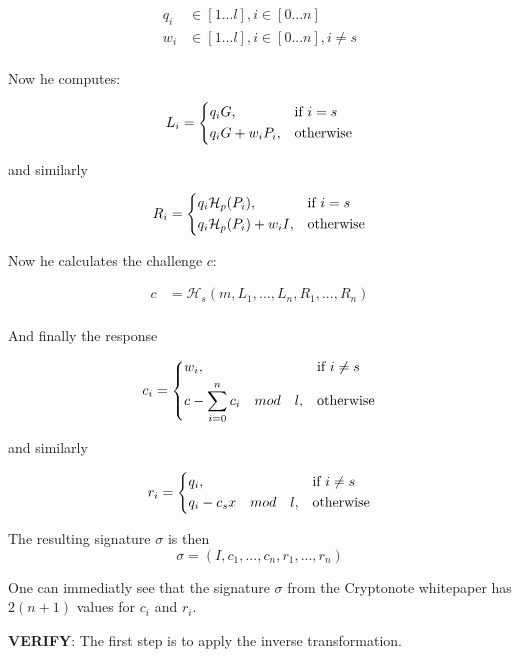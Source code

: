 \begin{equation}
\begin{split}
q_i &\in [1...l],  i \in [0...n] \\
w_i &\in [1...l],  i \in [0...n], i \not= s \\
\end{split}
\end{equation}

Now he computes:

\[
L_i= 
\begin{dcases}
q_iG,& \text{if } i = s\\
q_iG+w_iP_i,              & \text{otherwise}
\end{dcases}
\]

and similarly

\[
R_i= 
\begin{dcases}
q_i\mathcal{H}_p(P_i),& \text{if } i = s\\
q_i\mathcal{H}_p(P_i)+w_iI,              & \text{otherwise}
\end{dcases}
\]

Now he calculates the challenge $c$:

\begin{equation}
\begin{split}
c &= \mathcal{H}_s(m, L_1, ..., L_n, R_1, ..., R_n)\\
\end{split}
\end{equation}

And finally the response 

\[
c_i= 
\begin{dcases}
w_i,& \text{if } i \not= s\\
c-\sum_{i=0}^n c_i \quad mod\quad l,              & \text{otherwise}
\end{dcases}
\]

and similarly

\[
r_i= 
\begin{dcases}
q_i,& \text{if } i \not= s\\
q_i-c_sx \quad mod\quad l,              & \text{otherwise}
\end{dcases}
\]

The resulting signature $\sigma$ is then
\[
\sigma = (I, c_1, ..., c_n, r_1, ..., r_n)
\]

One can immediatly see that the signature $\sigma$ from the Cryptonote 
whitepaper has $2(n+1)$ values for $c_i$ and $r_i$.

\hfill \break\textbf{VERIFY}: 
The first step is to apply the inverse transformation.

